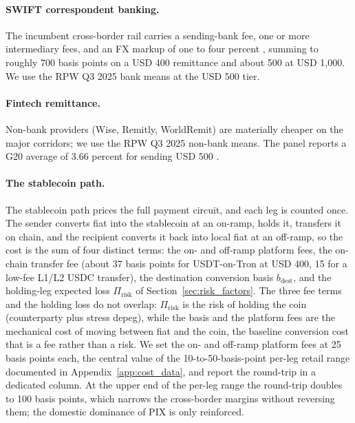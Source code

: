 \paragraph{SWIFT correspondent banking.} The incumbent cross-border rail carries a sending-bank fee, one or more intermediary fees, and an FX markup of one to four percent \citep{cpmi_2018_cross_border_retail}, summing to roughly 700 basis points on a USD 400 remittance and about 500 at USD 1{,}000. We use the RPW Q3 2025 bank means at the USD 500 tier.

\paragraph{Fintech remittance.} Non-bank providers (Wise, Remitly, WorldRemit) are materially cheaper on the major corridors; we use the RPW Q3 2025 non-bank means. The panel reports a G20 average of 3.66 percent for sending USD 500 \citep{rpw_q3_2025}.

\paragraph{The stablecoin path.} The stablecoin path prices the full payment circuit, and each leg is counted once. The sender converts fiat into the stablecoin at an on-ramp, holds it, transfers it on chain, and the recipient converts it back into local fiat at an off-ramp, so the cost is the sum of four distinct terms: the on- and off-ramp platform fees, the on-chain transfer fee (about 37 basis points for USDT-on-Tron at USD 400, 15 for a low-fee L1/L2 USDC transfer), the destination conversion basis $b_{\text{dest}}$, and the holding-leg expected loss $\Pi_{\text{risk}}$ of Section~\ref{sec:risk_factors}. The three fee terms and the holding loss do not overlap: $\Pi_{\text{risk}}$ is the risk of holding the coin (counterparty plus stress depeg), while the basis and the platform fees are the mechanical cost of moving between fiat and the coin, the baseline conversion cost that is a fee rather than a risk. We set the on- and off-ramp platform fees at 25 basis points each, the central value of the 10-to-50-basis-point per-leg retail range documented in Appendix~\ref{app:cost_data}, and report the round-trip in a dedicated column. At the upper end of the per-leg range the round-trip doubles to 100 basis points, which narrows the cross-border margins without reversing them; the domestic dominance of PIX is only reinforced.

